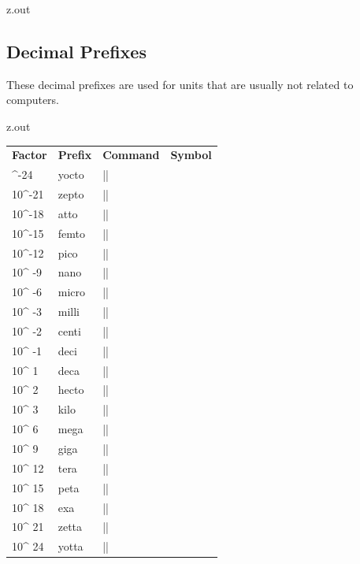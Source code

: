 \begin{VerbatimOut}{z.out}

\subsection{Decimal Prefixes}

These decimal prefixes are used for units that are usually not
related to computers.
\end{VerbatimOut}

\MyIO


\begin{VerbatimOut}{z.out}

{
  \noindent
  \hspace*{2\parindent}\begin{tabular}{@{}mlll@{}}
    \textbf{Factor}& \textbf{Prefix}& \textbf{Command}& \textbf{Symbol}\\
    \tabularspace
    10^{-24}& yocto& |\yocto|& \unit{\yocto\nounit}\\
    10^{-21}& zepto& |\zepto|& \unit{\zepto\nounit}\\
    10^{-18}& atto&  |\atto|&  \unit{\atto\nounit}\\
    10^{-15}& femto& |\femto|& \unit{\femto\nounit}\\
    10^{-12}& pico&  |\pico|&  \unit{\pico\nounit}\\
    10^{ -9}& nano&  |\nano|&  \unit{\nano\nounit}\\
    10^{ -6}& micro& |\micro|& \unit{\micro\nounit}\\
    10^{ -3}& milli& |\milli|& \unit{\milli\nounit}\\
    10^{ -2}& centi& |\centi|& \unit{\centi\nounit}\\
    10^{ -1}& deci&  |\deci|&  \unit{\deci\nounit}\\
    10^{  1}& deca&  |\deca|&  \unit{\deca\nounit}\\   %
    10^{  2}& hecto& |\hecto|& \unit{\hecto\nounit}\\
    10^{  3}& kilo&  |\kilo|&  \unit{\kilo\nounit}\\
    10^{  6}& mega&  |\mega|&  \unit{\mega\nounit}\\
    10^{  9}& giga&  |\giga|&  \unit{\giga\nounit}\\
    10^{ 12}& tera&  |\tera|&  \unit{\tera\nounit}\\
    10^{ 15}& peta&  |\peta|&  \unit{\peta\nounit}\\
    10^{ 18}& exa&   |\exa|&   \unit{\exa\nounit}\\
    10^{ 21}& zetta& |\zetta|& \unit{\zetta\nounit}\\
    10^{ 24}& yotta& |\yotta|& \unit{\yotta\nounit}\\
  \end{tabular}
}
\end{VerbatimOut}


